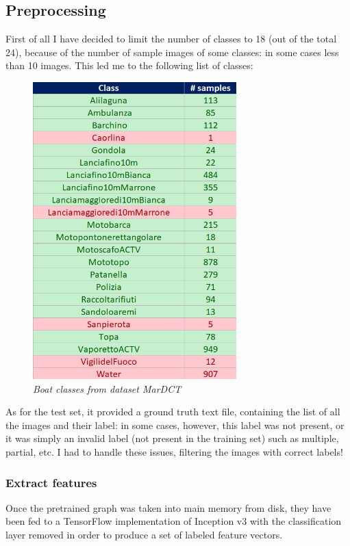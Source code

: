 \documentclass[12pt]{article}
\begin{document}
\subsection{Preprocessing}
First of all I have decided to limit the number of classes to 18 (out of the total 24), because of the number of sample images of some classes: in some cases less than 10 images. This led me to the following list of classes:

\begin{figure}[!ht]
	\centering %
	\includegraphics[width=0.7\textwidth]{labels.png} %
	\caption{\textit{Boat classes from dataset MarDCT}} %
	\label{fig:labels}
\end{figure}

As for the test set, it provided a ground truth text file, containing the list of all the images and their label: in some cases, however, this label was not present, or it was simply an invalid label (not present in the training set) such as multiple, partial, etc. I had to handle these issues, filtering the images with correct labels!

\subsubsection{Extract features}
Once the pretrained graph was taken into main memory from disk, they have been fed to a TensorFlow implementation of Inception v3 with the classification layer removed in order to produce a set of labeled feature vectors.
\end{document}
